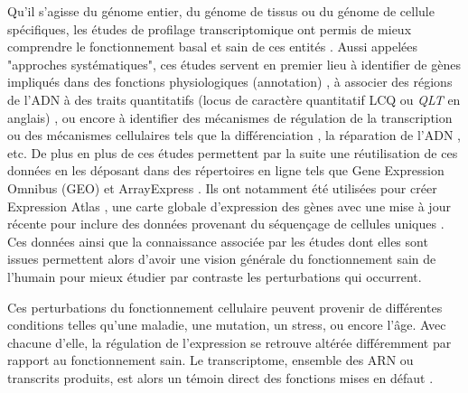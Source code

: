 Qu'il s'agisse du génome entier, du génome de tissus ou du génome de cellule spécifiques, les études de profilage transcriptomique ont permis de mieux comprendre le fonctionnement basal et sain de ces entités \cite{Hughes2000, Cloonan2008Jul}. Aussi appelées "approches systématiques", ces études servent en premier lieu à identifier de gènes impliqués dans des fonctions physiologiques (annotation) \cite{Munji2019Nov}, à associer des régions de l'ADN à des traits quantitatifs (locus de caractère quantitatif LCQ ou \textit{QLT} en anglais) \cite{Sarkar2019Apr}, ou encore à identifier des mécanismes de régulation de la transcription \cite{Segales2016Dec} ou des mécanismes cellulaires tels que la différenciation \cite{Godoy2018Jul}, la réparation de l'ADN \cite{Jividen2018Dec}, etc. De plus en plus de ces études permettent par la suite une réutilisation de ces données en les déposant dans des répertoires en ligne tels que Gene Expression Omnibus (GEO) \cite{Barrett2013Jan} et ArrayExpress \cite{Athar2019Jan}. Ils ont notamment été utilisées pour créer Expression Atlas \cite{Lukk2010Apr}, une carte globale d'expression des gènes avec une mise à jour récente pour inclure des données provenant du séquençage de cellules uniques \cite{Papatheodorou2020Jan}. Ces données ainsi que la connaissance associée par les études dont elles sont issues permettent alors d'avoir une vision générale du fonctionnement sain de l'humain pour mieux étudier par contraste les perturbations qui occurrent.

Ces perturbations du fonctionnement cellulaire peuvent provenir de différentes conditions telles qu'une maladie, une mutation, un stress, ou encore l'âge. Avec chacune d'elle, la régulation de l'expression se retrouve altérée différemment par rapport au fonctionnement sain. Le transcriptome, ensemble des ARN ou transcrits produits, est alors un témoin direct des fonctions mises en défaut \cite{Morozova2009Aug}. 

